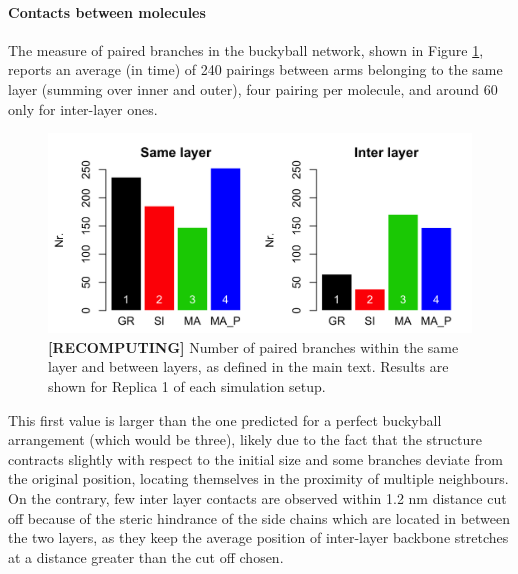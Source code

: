 \paragraph{Contacts between molecules} The measure of paired branches in the buckyball network, shown in Figure \ref{fig:BTI_beta}, reports an average (in time) of 240 pairings between arms belonging to the same layer (summing over inner and outer), four pairing per molecule, and around 60 only for inter-layer ones.
%
\begin{figure}[p]
\centering
\includegraphics[width=0.85\linewidth]{3results_capsule/pics/stAll_beta_R1.png}
\caption[Branch pairing during simulations of the buckyball]{\textbf{[RECOMPUTING]} Number of paired branches within the same layer and between layers, as defined in the main text. Results are shown for Replica 1 of each simulation setup.}
\label{fig:BTI_beta}
\end{figure}
%
This first value is larger than the one predicted for a perfect buckyball arrangement (which would be three), likely due to the fact that the structure contracts slightly with respect to the initial size and some branches deviate from the original position, locating themselves in the proximity of multiple neighbours. On the contrary, few inter layer contacts are observed within 1.2 nm distance cut off because of the steric hindrance of the side chains which are located in between the two layers, as they keep the average position of inter-layer backbone stretches at a distance greater than the cut off chosen.

